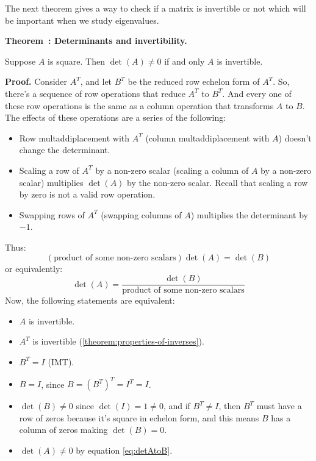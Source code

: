 \documentclass[11pt, letterpaper]{report}
\newenvironment{notes}{}{}
\newenvironment{book}{}{}
\newcounter{theorem}[chapter]
\newenvironment{theorem}[1][]{\refstepcounter{theorem}\begin{bbox}\par
    \noindent\textbf{Theorem~\thetheorem: #1}}{\end{bbox}}
\newlength\oldfboxsep%
\newlength\myminiwidth%
\newenvironment{bbox}{%
  \setlength\oldfboxsep\fboxsep
  \setlength{\fboxsep}{.1in}%
  \setlength\myminiwidth\linewidth%
  \addtolength\myminiwidth{-0.2in}%
  \vspace{0.1in}%
  \begin{lrbox}{\bboxbox}\begin{minipage}{\myminiwidth}%
    }{%
    \end{minipage}\end{lrbox}%
  \noindent\fbox{\usebox{\bboxbox}}\vspace{0.1in}\setlength\fboxsep\oldfboxsep%
}
\begin{document}
The next theorem gives a way to check if a matrix is invertible or not which will be important when we study eigenvalues.

\begin{notes}
\end{notes}
\begin{theorem}[Determinants and invertibility.]  
\label{theorem:determinants-and-invertibility}

Suppose $A$ is square. Then $\det(A) \ne 0$ if and only $A$ is invertible.
\end{theorem}

\begin{notes}
\vfill
\vfill
\newpage
\end{notes}

\begin{book}
\textbf{Proof.} Consider $A^T$, and let $B^T$ be the reduced row echelon form of $A^T$. So, there's a sequence of row operations that reduce $A^T$ to $B^T$. And every one of these row operations is the same as a column operation that transforms $A$ to $B$. The effects of these operations are a series of the following:
\begin{itemize}
\item Row multaddiplacement with $A^T$ (column multaddiplacement with $A$) doesn't change the determinant.
\item Scaling a row of $A^T$ by a non-zero scalar (scaling a column of $A$ by a non-zero scalar) multiplies $\det(A)$ by the non-zero scalar. Recall that scaling a row by zero is not a valid row operation.
\item Swapping rows of $A^T$ (swapping columns of $A$) multiplies the determinant by $-1$.
\end{itemize}
Thus:
\[(\text{product of some non-zero scalars})\det(A) = \det(B)\]%
or equivalently:
\begin{equation}
\label{eq:detAtoB}
\det(A) = \frac{\det(B)}{\text{product of some non-zero scalars}}
\end{equation}
Now, the following statements are equivalent:
\begin{itemize}
\item $A$ is invertible.
\item $A^T$ is invertible (\ref{theorem:properties-of-inverses}).
\item $B^T = I$ (IMT).
\item $B = I$, since $B=( B^T )^T = I^T = I$.
\item $\det(B) \ne 0$ since $\det(I) = 1 \ne 0$, and if $B^T \ne I$, then $B^T$ must have a row of zeros because it's square in echelon form, and this means $B$ has a column of zeros making $\det(B) = 0$.
\item $\det(A) \ne 0$ by equation \ref{eq:detAtoB}.
\end{itemize}
\blacksquare
\end{book}
\end{document}
